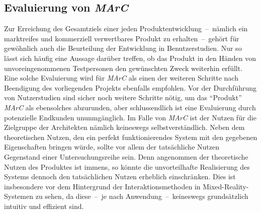 \subsection{Evaluierung von \emph{MArC}}
Zur Erreichung des Gesamtziels einer jeden Produktentwicklung~--~nämlich ein markt\-rei\-fes und kommerziell verwertbares Produkt zu erhalten~--~gehört für gewöhnlich auch die Beurteilung der Entwicklung in Benutzerstudien. Nur so lässt sich häufig eine Aussage darüber treffen, ob das Produkt in den Händen von unvoreingenommenen Testpersonen den gewünschten Zweck weiterhin erfüllt.\\
Eine solche Evaluierung wird für \emph{MArC} als einen der weiteren Schritte nach Beendigung des vorliegenden Projekts ebenfalls empfohlen. Vor der Durchführung von Nutzerstudien sind sicher noch weitere Schritte nötig, um das "`Produkt"' \emph{MArC} als ebensolches abzurunden, aber schlussendlich ist eine Evaluierung durch potenzielle Endkunden ununmgänglich. Im Falle von \emph{MArC} ist der Nutzen für die Zielgruppe der Architekten nämlich keineswegs selbstverständlich. Neben dem theoretischen Nutzen, den ein perfekt funktionierendes System mit den gegebenen Eigenschaften bringen würde, sollte vor allem der tatsächliche Nutzen Gegenstand einer Untersuchungsreihe sein. Denn angenommen der theoretische Nutzen des Produktes ist immens, so könnte die unvorteilhafte Realisierung des Systems dennoch den tatsächlichen Nutzen erheblich einschränken. Dies ist insbesondere vor dem Hintergrund der Interaktionsmethoden in Mixed-Reality-Systemen zu sehen, da diese~--~je nach Anwendung~--~keineswegs grundsätzlich intuitiv und effizient sind.